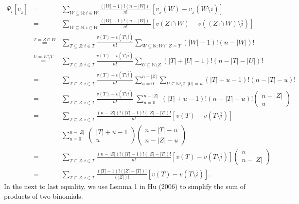 \documentclass[a4paper,12pt]{article}
\begin{document}
$$
\begin{array}{rcl}
\Psi_i[v_{_Z}]
&=&
\sum\limits_{W\subseteq \mathbb{N}: i\in W}  \frac{(|W|-1)!(n-|W|)!}{n!} \left [ v_{_Z}(W) - v_{_Z} (W \setminus \overline{i}) \right ] \\
&=&
\sum\limits_{W\subseteq \mathbb{N}: i\in W}  \frac{(|W|-1)!(n-|W|)!}{n!} \left [ v(Z\cap W) - v ((Z\cap W) \setminus \overline{i}) \right ]\\
&\stackrel{T=Z\cap W}{=}&
\sum\limits_{T\subseteq Z: i\in T} \frac{v(T) - v (T \setminus \overline{i})}{n!} \sum\limits_{W\subseteq \mathbb{N}:W \cap Z = T}  (|W|-1)!(n-|W|)! \\
&\stackrel{U=W\setminus T}{=}&
\sum\limits_{T\subseteq Z: i\in T} \frac{v(T) - v (T \setminus \overline{i})}{n!} \sum\limits_{U\subseteq \mathbb{N}\setminus Z}  (|T|+|U|-1)!(n-|T|-|U|)! \\
&=&
\sum\limits_{T\subseteq Z: i\in T} \frac{v(T) - v (T \setminus \overline{i})}{n!} \sum\limits_{u=0}^{n-|Z|}\sum\limits_{U\subseteq \mathbb{N}\setminus Z: |U|=u}  (|T|+u-1)!(n-|T|-u)! \\
&=&
\sum\limits_{T\subseteq Z: i\in T} \frac{v(T) - v (T \setminus \overline{i})}{n!}\ \sum\limits_{u=0}^{n-|Z|}\ (|T|+u-1)!(n-|T|-u)! 
\left ( \begin{array}{c} n-|Z| \\ u \end{array} \right ) \\
&=&
\sum\limits_{T\subseteq Z: i\in T} \frac{(n-|Z|)! (|T|-1)! (|Z|-|T|)!}{n!}\left [v(T)-v (T \setminus \overline{i}) \right ] \\
&&
\sum\limits_{u=0}^{n-|Z|}\ \left ( \begin{array}{c} |T|+u -1 \\ u \end{array} \right ) \left ( \begin{array}{c} n-|T|-u \\ n-|Z| - u\end{array}   \right )\\
&=&
\sum\limits_{T\subseteq Z: i\in T}   \frac{(n-|Z|)! (|T|-1)! (|Z|-|T|)!}{n!}\left [v(T)-v (T \setminus \overline{i}) \right ] 
\left ( \begin{array}{c} n \\ n-|Z| \end{array}   \right )  \\
&=&
\sum\limits_{T\subseteq Z: i \in T} \frac{(|T|-1)!(|Z|-|T|)!}{(|Z|)!} \left [ v(T) - v(T\setminus \overline{i})\right ].
\end{array}
$$
In the next to last equality, we use Lemma 1 in Hu (2006) to simplify the sum of products of two binomials.
\end{document}
